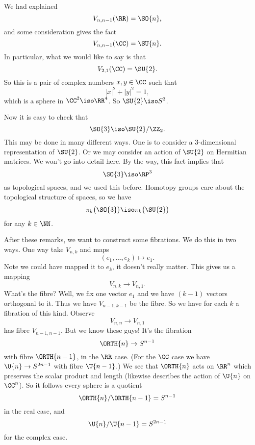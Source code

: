 We had explained
\begin{equation}
V_{n,n-1}(\RR)=\SO{n},
\end{equation}
and some consideration gives the fact
\begin{equation}
V_{n,n-1}(\CC)=\SU{n}.
\end{equation}
In particular, what we would like to say is that 
\begin{equation}
V_{2,1}(\CC)=\SU{2}.
\end{equation}
So this is a pair of complex numbers $x,y\in\CC$ such that 
\begin{equation}
|x|^{2}+|y|^{2}=1,
\end{equation}
which is a sphere in $\CC^2\iso\RR^4$. So $\SU{2}\iso
S^{3}$.

Now it is easy to check that
\begin{equation}
\SO{3}\iso\SU{2}/\ZZ_{2}.
\end{equation}
This may be done in many different ways. One is to consider a
3-dimensional representation of $\SU{2}$. Or we may consider an
action of $\SU{2}$ on Hermitian matrices. We won't go into detail
here. By the way, this fact implies that
\begin{equation}
\SO{3}\iso\RP^{3}
\end{equation}
as topological spaces, and we used this before. Homotopy groups
care about the topological structure of spaces, so we have
\begin{equation}
\pi_{k}\bigl(\SO{3}\bigr)\iso\pi_{k}\bigl(\SU{2}\bigr)
\end{equation}
for any $k\in\NN$.

After these remarks, we want to construct some fibrations. We do
this in two ways. One way take $V_{n,k}$ and maps
\begin{equation}
(e_{1},\dots,e_{k})\mapsto e_{1}.
\end{equation}
Note we could have mapped it to $e_k$, it doesn't really
matter. This gives us a mapping
\begin{equation}
V_{n,k}\to V_{n,1}.
\end{equation}
What's the fibre? Well, we fix one vector $e_1$ and we have
$(k-1)$ vectors orthogonal to it. Thus we have $V_{n-1,k-1}$ be
the fibre. So we have for each $k$ a fibration of this
kind. Observe
\begin{equation}
V_{n,n}\to V_{n,1}
\end{equation}
has fibre $V_{n-1,n-1}$. But we know these guys! It's the
fibration
\begin{equation}
\ORTH{n}\to S^{n-1}
\end{equation}
with fibre $\ORTH{n-1}$, in the $\RR$ case. (For the $\CC$ case
we have $\U{n}\to S^{2n-1}$ with fibre $\U{n-1}$.) We see that
$\ORTH{n}$ acts on $\RR^n$ which preserves the scalar product and
length (likewise describes the action of $\U{n}$ on $\CC^n$). So
it follows every sphere is a quotient
\begin{equation}
\ORTH{n}/\ORTH{n-1}=S^{n-1}
\end{equation}
in the real case, and
\begin{equation}
\U{n}/\U{n-1}=S^{2n-1}
\end{equation}
for the complex case.


